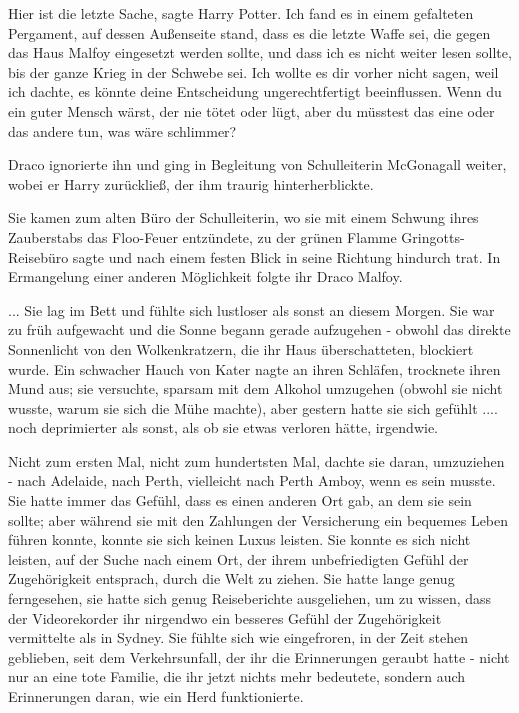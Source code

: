 \glqq{}Hier ist die letzte Sache\grqq{}, sagte Harry Potter. \glqq{}Ich fand es in
einem gefalteten Pergament, auf dessen Außenseite stand, dass es die letzte
Waffe sei, die gegen das Haus Malfoy eingesetzt werden sollte, und dass ich es
nicht weiter lesen sollte, bis der ganze Krieg in der Schwebe sei. Ich wollte es
dir vorher nicht sagen, weil ich dachte, es könnte deine Entscheidung
ungerechtfertigt beeinflussen. Wenn du ein guter Mensch wärst, der nie tötet
oder lügt, aber du müsstest das eine oder das andere tun, was wäre
schlimmer?\grqq{}

Draco ignorierte ihn und ging in Begleitung von Schulleiterin McGonagall weiter,
wobei er Harry zurückließ, der ihm traurig hinterherblickte.

Sie kamen zum alten Büro der Schulleiterin, wo sie mit einem Schwung ihres
Zauberstabs das Floo-Feuer entzündete, zu der grünen Flamme \glqq{}
Gringotts-Reisebüro\grqq{} sagte und nach einem festen Blick in seine Richtung
hindurch trat. In Ermangelung einer anderen Möglichkeit folgte ihr Draco Malfoy.

... Sie lag im Bett und fühlte sich lustloser als sonst an diesem Morgen. Sie
war zu früh aufgewacht und die Sonne begann gerade aufzugehen - obwohl das
direkte Sonnenlicht von den Wolkenkratzern, die ihr Haus überschatteten,
blockiert wurde. Ein schwacher Hauch von Kater nagte an ihren Schläfen,
trocknete ihren Mund aus; sie versuchte, sparsam mit dem Alkohol umzugehen
(obwohl sie nicht wusste, warum sie sich die Mühe machte), aber gestern hatte
sie sich gefühlt .... noch deprimierter als sonst, als ob sie etwas verloren
hätte, irgendwie.

Nicht zum ersten Mal, nicht zum hundertsten Mal, dachte sie daran, umzuziehen -
nach Adelaide, nach Perth, vielleicht nach Perth Amboy, wenn es sein musste. Sie
hatte immer das Gefühl, dass es einen anderen Ort gab, an dem sie sein sollte;
aber während sie mit den Zahlungen der Versicherung ein bequemes Leben führen
konnte, konnte sie sich keinen Luxus leisten. Sie konnte es sich nicht leisten,
auf der Suche nach einem Ort, der ihrem unbefriedigten Gefühl der Zugehörigkeit
entsprach, durch die Welt zu ziehen. Sie hatte lange genug ferngesehen, sie
hatte sich genug Reiseberichte ausgeliehen, um zu wissen, dass der Videorekorder
ihr nirgendwo ein besseres Gefühl der Zugehörigkeit vermittelte als in Sydney.
Sie fühlte sich wie eingefroren, in der Zeit stehen geblieben, seit dem
Verkehrsunfall, der ihr die Erinnerungen geraubt hatte - nicht nur an eine tote
Familie, die ihr jetzt nichts mehr bedeutete, sondern auch Erinnerungen daran,
wie ein Herd funktionierte.

